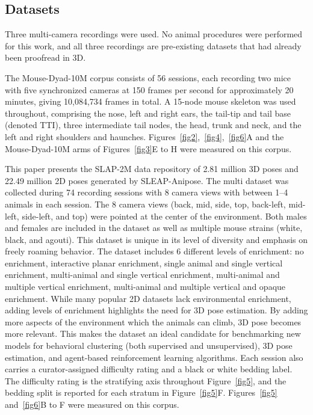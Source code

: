 \documentclass[pdflatex, sn-nature]{sn-jnl}
\theoremstyle{thmstyleone}%
\theoremstyle{thmstyletwo}%
\theoremstyle{thmstylethree}%
\begin{document}
\subsection{Datasets}\label{methods-datasets}

Three multi-camera recordings were used. No animal procedures were performed for this work, and all three recordings are pre-existing datasets that had already been proofread in 3D.

The Mouse-Dyad-10M corpus consists of 56 sessions, each recording two mice with five synchronized cameras at 150 frames per second for approximately 20 minutes, giving 10,084,734 frames in total. A 15-node mouse skeleton was used throughout, comprising the nose, left and right ears, the tail-tip and tail base (denoted TTI), three intermediate tail nodes, the head, trunk and neck, and the left and right shoulders and haunches. Figures~\ref{fig2},~\ref{fig4},~\ref{fig6}A and the Mouse-Dyad-10M arms of Figures~\ref{fig3}E to H were measured on this corpus.

This paper presents the SLAP-2M data repository of 2.81 million 3D poses and 22.49 million 2D poses generated by SLEAP-Anipose. The multi dataset was collected during 74 recording sessions with 8 camera views with between 1--4 animals in each session. The 8 camera views (back, mid, side, top, back-left, mid-left, side-left, and top) were pointed at the center of the environment. Both males and females are included in the dataset as well as multiple mouse strains (white, black, and agouti). This dataset is unique in its level of diversity and emphasis on freely roaming behavior. The dataset includes 6 different levels of enrichment: no enrichment, interactive planar enrichment, single animal and single vertical enrichment, multi-animal and single vertical enrichment, multi-animal and multiple vertical enrichment, multi-animal and multiple vertical and opaque enrichment. While many popular 2D datasets lack environmental enrichment, adding levels of enrichment highlights the need for 3D pose estimation. By adding more aspects of the environment which the animals can climb, 3D pose becomes more relevant. This makes the dataset an ideal candidate for benchmarking new models for behavioral clustering (both supervised and unsupervised), 3D pose estimation, and agent-based reinforcement learning algorithms. Each session also carries a curator-assigned difficulty rating and a black or white bedding label. The difficulty rating is the stratifying axis throughout Figure~\ref{fig5}, and the bedding split is reported for each stratum in Figure~\ref{fig5}F. Figures~\ref{fig5} and~\ref{fig6}B to F were measured on this corpus.
\end{document}
